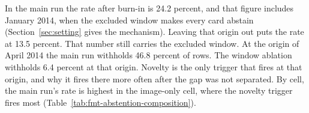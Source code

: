 In the main run the rate after burn-in is 24.2 percent, and that figure includes January 2014, when the excluded window makes every card abstain (Section~\ref{sec:setting} gives the mechanism).
Leaving that origin out puts the rate at 13.5 percent. That number still carries the excluded window. At the origin of April 2014 the main run withholds 46.8 percent of rows. The window ablation withholds 6.4 percent at that origin. Novelty is the only trigger that fires at that origin, and why it fires there more often after the gap was not separated. By cell, the main run's rate is highest in the image-only cell, where the novelty trigger fires most (Table~\ref{tab:fmt-abstention-composition}).

\begin{table}[t]\centering\scriptsize
\caption{Abstention triggers on the headline archive, taken from Table~\ref{tab:abstention-upworthy} (Appendix~\ref{app:tables}), for all cells. The rows give each trigger, then any trigger. The columns give the rows that were withheld, what share of all rows they make up, and when the trigger fires. One row can trip more than one trigger, so the counts do not sum to the total. The entries are counts, so no row has an interval.}
\label{tab:fmt-abstention-triggers}

\end{table}

